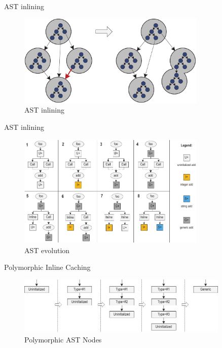 \documentclass[xcolor=dvipsname,handout]{beamer} %
\begin{document}
\begin{frame}[fragile]{AST inlining}
  \begin{figure}
    \centering
    \includegraphics[width=0.8\textwidth]{image02-2.pdf}
    \caption{AST inlining}
    \label{fig:inlining}
  \end{figure}
\end{frame}

\begin{frame}[fragile]{AST inlining}
  \begin{figure}
    \centering
    \includegraphics[width=0.8\textwidth]{image01-2.pdf}
    \caption{AST evolution}
    \label{fig:inlining2}
  \end{figure}
\end{frame}

\begin{frame}{Polymorphic Inline Caching}
  \begin{figure}
    \centering
    \includegraphics[width=0.9\textwidth]{poly.pdf}
    \caption{Polymorphic AST Nodes}
    \label{fig:poly}
  \end{figure}
\end{frame}
\end{document}
